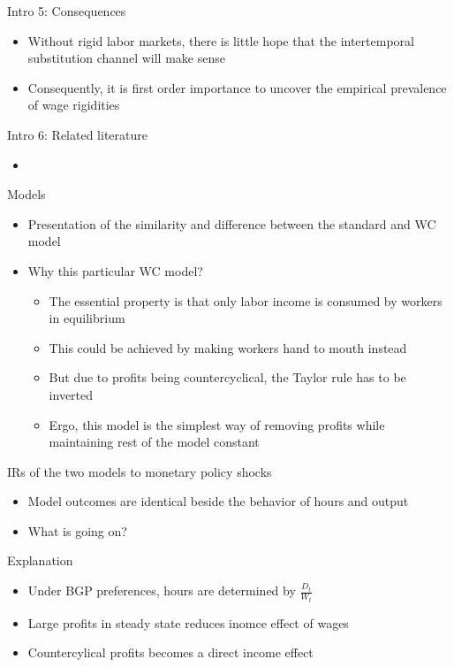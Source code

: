 \documentclass{beamer}
\newcommand{\bit}{\begin{itemize}}
\newcommand{\eit}{\end{itemize}}
\begin{document}
\begin{frame}{Intro 5: Consequences}

\bit
	\item Without rigid labor markets, there is little hope that the intertemporal substitution channel will make sense
	\item Consequently, it is first order importance to uncover the empirical prevalence of wage rigidities
\eit


\end{frame}

\begin{frame}{Intro 6: Related literature}

\bit
	\item 
\eit


\end{frame}

\begin{frame}{Models}

\bit
	\item Presentation of the similarity and difference between the standard and WC model
	\item Why this particular WC model?
		\bit
			\item The essential property is that only labor income is consumed by workers in equilibrium
			\item This could be achieved by making workers hand to mouth instead
			\item But due to profits being countercyclical, the Taylor rule has to be inverted
			\item Ergo, this model is the simplest way of removing profits while maintaining rest of the model constant 
		\eit
\eit


\end{frame}

\begin{frame}{IRs of the two models to monetary policy shocks}

\bit
	\item Model outcomes are identical beside the behavior of hours and output
	\item What is going on? 
\eit


\end{frame}


\begin{frame}{Explanation}

\bit
	\item Under BGP preferences, hours are determined by $\frac{D_t}{W_t}$
	\item Large profits in steady state reduces inomce effect of wages
	\item Countercylical profits becomes a direct income effect
\eit


\end{frame}
\end{document}
